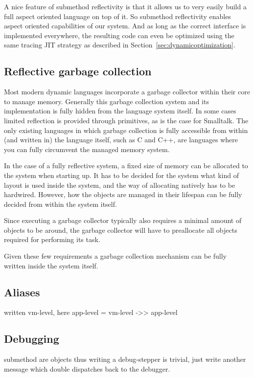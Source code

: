 \documentclass{article}
\newcommand{\secref}[1]{Section~\ref{sec:#1}}
\begin{document}
A nice feature of submethod reflectivity is that it allows us to very
easily build a full aspect oriented language on top of it. So
submethod reflectivity enables aspect oriented capabilities of our
system. And as long as the correct interface is implemented
everywhere, the resulting code can even be optimized using the same
tracing JIT strategy as described in \secref{dynamicoptimization}.

\subsection{Reflective garbage collection}
Most modern dynamic languages incorporate a garbage collector within
their core to manage memory. Generally this garbage collection system
and its implementation is fully hidden from the language system
itself. In some cases limited reflection is provided through
primitives, as is the case for Smalltalk. The only existing languages
in which garbage collection is fully accessible from within (and
written in) the language itself, such as C and C++, are languages
where you can fully circumvent the managed memory system.

In the case of a fully reflective system, a fixed size of memory can
be allocated to the system when starting up. It has to be decided for
the system what kind of layout is used inside the system, and the way
of allocating natively has to be hardwired. However, how the objects
are managed in their lifespan can be fully decided from within the
system itself.

Since executing a garbage collector typically also requires a minimal
amount of objects to be around, the garbage collector will have to
preallocate all objects required for performing its task.

Given these few requirements a garbage collection mechanism can be
fully written inside the system itself. 

\subsection{Aliases}
written vm-level, here app-level = vm-level ->> app-level

\subsection{Debugging}
submethod are objects thus writing a debug-stepper is trivial, just
write another message which double dispatches back to the debugger.
\end{document}
